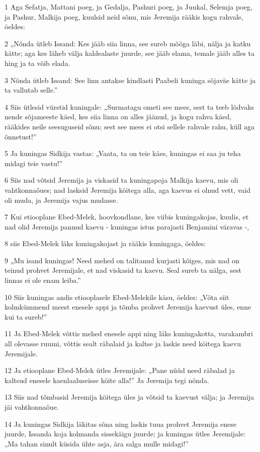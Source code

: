 \par 1 Aga Sefatja, Mattani poeg, ja Gedalja, Pashuri poeg, ja Juukal, Selemja poeg, ja Pashur, Malkija poeg, kuulsid neid sõnu, mis Jeremija rääkis kogu rahvale, öeldes:
\par 2 „Nõnda ütleb Issand: Kes jääb siia linna, see sureb mõõga läbi, nälja ja katku kätte; aga kes läheb välja kaldealaste juurde, see jääb elama, temale jääb alles ta hing ja ta võib elada.
\par 3 Nõnda ütleb Issand: See linn antakse kindlasti Paabeli kuninga sõjaväe kätte ja ta vallutab selle.”
\par 4 Siis ütlesid vürstid kuningale: „Surmatagu ometi see mees, sest ta teeb lõdvaks nende sõjameeste käed, kes siia linna on alles jäänud, ja kogu rahva käed, rääkides neile seesuguseid sõnu; sest see mees ei otsi sellele rahvale rahu, küll aga õnnetust!”
\par 5 Ja kuningas Sidkija vastas: „Vaata, ta on teie käes, kuningas ei saa ju teha midagi teie vastu!”
\par 6 Siis nad võtsid Jeremija ja viskasid ta kuningapoja Malkija kaevu, mis oli vahtkonnaõues; nad lasksid Jeremija köitega alla, aga kaevus ei olnud vett, vaid oli muda, ja Jeremija vajus mudasse.
\par 7 Kui etiooplane Ebed-Melek, hoovkondlane, kes viibis kuningakojas, kuulis, et nad olid Jeremija pannud kaevu - kuningas istus parajasti Benjamini väravas -,
\par 8 siis Ebed-Melek läks kuningakojast ja rääkis kuningaga, öeldes:
\par 9 „Mu isand kuningas! Need mehed on talitanud kurjasti kõiges, mis nad on teinud prohvet Jeremijale, et nad viskasid ta kaevu. Seal sureb ta nälga, sest linnas ei ole enam leiba.”
\par 10 Siis kuningas andis etiooplasele Ebed-Melekile käsu, öeldes: „Võta siit kolmkümmend meest enesele appi ja tõmba prohvet Jeremija kaevust üles, enne kui ta sureb!”
\par 11 Ja Ebed-Melek võttis mehed enesele appi ning läks kuningakotta, varakambri all olevasse ruumi, võttis sealt räbalaid ja kaltse ja laskis need köitega kaevu Jeremijale.
\par 12 Ja etiooplane Ebed-Melek ütles Jeremijale: „Pane nüüd need räbalad ja kaltsud enesele kaenlaaluseisse köite alla!” Ja Jeremija tegi nõnda.
\par 13 Siis nad tõmbasid Jeremija köitega üles ja võtsid ta kaevust välja; ja Jeremija jäi vahtkonnaõue.
\par 14 Ja kuningas Sidkija läkitas sõna ning laskis tuua prohvet Jeremija enese juurde, Issanda koja kolmanda sissekäigu juurde; ja kuningas ütles Jeremijale: „Ma tahan sinult küsida ühte asja, ära salga mulle midagi!”
